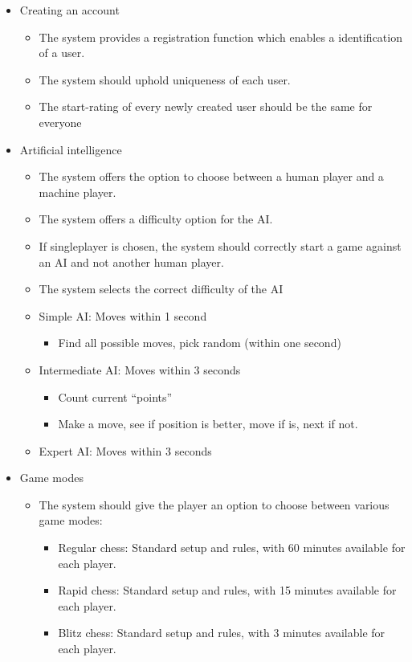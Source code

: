 \documentclass{article}
\begin{document}
\begin{itemize}
	\item Creating an account
	\begin{itemize}
		\item The system provides a registration function which enables a identification of a user.
		\item The system should uphold uniqueness of each user.
		\item The start-rating of every newly created user should be the same for everyone 
	\end{itemize}
	\item Artificial intelligence
	\begin{itemize}
	    \item The system offers the option to choose between a human player and a machine player.
		\item The system offers a difficulty option for the AI.
		\item If singleplayer is chosen, the system should correctly start a game against an AI and not another human player.
		\item The system selects the correct difficulty of the AI
		\item Simple AI: Moves within 1 second
		\begin{itemize}
			\item Find all possible moves, pick random (within one second)
		\end{itemize}
		\item Intermediate AI: Moves within 3 seconds
		\begin{itemize}
			\item Count current “points”
			\item Make a move, see if position is better, move if is, next if not.
		\end{itemize}
		\item Expert AI: Moves within 3 seconds
	\end{itemize}
	\item Game modes
	\begin{itemize}
		\item The system should give the player an option to choose between various game modes:
		\begin{itemize}
			\item Regular chess: Standard setup and rules, with 60 minutes available for each player.
			\item Rapid chess: Standard setup and rules, with 15 minutes available for each player.
			\item Blitz chess: Standard setup and rules, with 3 minutes available for each player.

\end{itemize}
\end{itemize}
\end{itemize}
\end{document}
